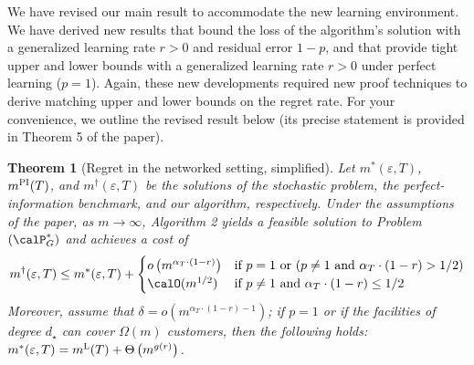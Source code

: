 \documentclass[11pt]{article}
\newtheorem{theorem}{Theorem}[] %
\begin{document}
We have revised our main result to accommodate the new learning environment. We have derived new results that bound the loss of the algorithm's solution with a generalized learning rate $r>0$ and residual error $1-p$, and that provide tight upper and lower bounds with a generalized learning rate $r>0$ under perfect learning ($p=1$). Again, these new developments required new proof techniques to derive matching upper and lower bounds on the regret rate. For your convenience, we outline the revised result below (its precise statement is provided in Theorem 5 of the paper).
\setcounter{theorem}{4}
\begin{theorem}[Regret in the networked setting, simplified]\label{thm:network_R2}
    Let $m^*(\varepsilon,T)$, $m^{\textsc{PI}}(T)$, and $m^\dagger(\varepsilon, T)$ be the solutions of the stochastic problem, the perfect-information benchmark, and our algorithm, respectively. Under the assumptions of the paper, as $m \to \infty$, Algorithm 2 yields a feasible solution to Problem $(\calP^*_G)$ and achieves a cost of
    $$m^\dagger(\varepsilon, T)\leq m^*(\varepsilon, T)+\begin{cases}
    	o\left(m^{\alpha_T \cdot (1-r)}\right)& \text{if }p=1 \text{ or } (p \neq 1 \text{ and } \alpha_T\cdot(1-r)>1/2)\\
    	\calO(m^{1/2}) & \text{if }p \neq 1\text{ and } \alpha_T\cdot(1-r)\leq 1/2
    \end{cases}$$
    Moreover, assume that $\delta = o\left(m^{\alpha_T\cdot(1-r)-1}\right)$; if $p=1$ or if the facilities of degree $d_\star$ can cover $\Omega(m)$ customers, then the following holds: $m^*(\varepsilon, T)= m^{\textsc{L}}(T)+\Theta\left(m^{g(r)}\right)$.
\end{theorem}
\end{document}
